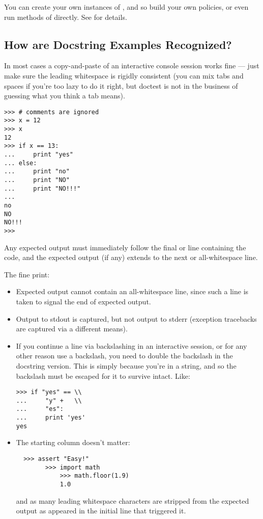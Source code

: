 You can create your own instances of , and so build your
own policies, or even run methods of  directly.  See
 for details.


\subsection{How are Docstring Examples Recognized?}

In most cases a copy-and-paste of an interactive console session works fine
--- just make sure the leading whitespace is rigidly consistent (you can mix
tabs and spaces if you're too lazy to do it right, but doctest is not in
the business of guessing what you think a tab means).

\begin{verbatim}
>>> # comments are ignored
>>> x = 12
>>> x
12
>>> if x == 13:
...     print "yes"
... else:
...     print "no"
...     print "NO"
...     print "NO!!!"
...
no
NO
NO!!!
>>>
\end{verbatim}

Any expected output must immediately follow the final
 or  line containing the code, and
the expected output (if any) extends to the next 
or all-whitespace line.

The fine print:

\begin{itemize}

\item Expected output cannot contain an all-whitespace line, since such a
  line is taken to signal the end of expected output.

\item Output to stdout is captured, but not output to stderr (exception
  tracebacks are captured via a different means).

\item If you continue a line via backslashing in an interactive session, or
  for any other reason use a backslash, you need to double the backslash in
  the docstring version.  This is simply because you're in a string, and so
  the backslash must be escaped for it to survive intact.  Like:

\begin{verbatim}
>>> if "yes" == \\
...     "y" +   \\
...     "es":
...     print 'yes'
yes
\end{verbatim}

\item The starting column doesn't matter:

\begin{verbatim}
  >>> assert "Easy!"
        >>> import math
            >>> math.floor(1.9)
            1.0
\end{verbatim}

and as many leading whitespace characters are stripped from the
expected output as appeared in the initial  line
that triggered it.
\end{itemize}

